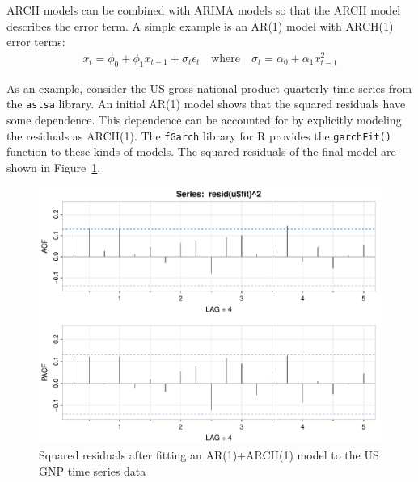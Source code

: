 ARCH models can be combined with ARIMA models so that the ARCH model describes the error term. A simple example is an AR(1) model with ARCH(1) error terms:
\begin{align*}
x_t = \phi_0 + \phi_1 x_{t-1} + \sigma_t \epsilon_t \quad \text{where} \quad \sigma_t = \alpha_0 + \alpha_1 x_{t-1}^2
\end{align*} 

As an example, consider the US gross national product quarterly time series from the \texttt{astsa} library. An initial AR(1) model shows that the squared residuals have some dependence. This dependence can be accounted for by explicitly modeling the residuals as ARCH(1). The \texttt{fGarch} library for R provides the \texttt{garchFit()} function to these kinds of models. The squared residuals of the final model are shown in Figure~\ref{fig:figure35}.

\begin{figure}
\centering
\centering
\includegraphics[width=.75\textwidth]{figure35.pdf}
\caption[Squared residuals after fitting an AR(1)+ARCH(1) model]{Squared residuals after fitting an AR(1)+ARCH(1) model to the US GNP time series data}
\label{fig:figure35}
\end{figure}

\begin{samepage}
\end{samepage}

